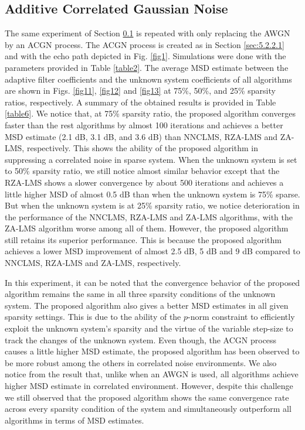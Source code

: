 \vspace{-0.3cm}
\subsection{Additive Correlated Gaussian Noise}\label{sec:5.3.2}
\vspace{-0.5cm}
\noindent The same experiment of Section \ref{sec:5.3.2} is repeated with only replacing the AWGN by an ACGN process. The ACGN process is created as in  Section \ref{sec:5.2.2.1} and with the echo path depicted in Fig. \ref{fig1}. Simulations were done with the parameters provided in Table \ref{table2}. The average MSD estimate between the adaptive filter coefficients and the unknown system coefficients of all algorithms are shown in Figs. \ref{fig11}, \ref{fig12} and \ref{fig13} at 75\%, 50\%, and 25\% sparsity ratios, respectively. A summary of the obtained results is provided in Table \ref{table6}. We notice that, at 75\% sparsity ratio, the proposed algorithm converges faster than the rest algorithms by almost 100 iterations and achieves a better MSD estimate (2.1 dB, 3.1 dB, and 3.6 dB) than NNCLMS, RZA-LMS and ZA-LMS, respectively. This shows the ability of the proposed algorithm in suppressing a correlated noise in sparse system. When the unknown system is set to 50\% sparsity ratio, we still notice almost similar behavior except that the RZA-LMS shows a slower convergence by about 500 iterations and achieves a little higher MSD of almost 0.5 dB than when the unknown system is 75\% sparse. But when the unknown system is at 25\% sparsity ratio, we notice deterioration in the performance of the NNCLMS, RZA-LMS and ZA-LMS algorithms, with the ZA-LMS algorithm worse among all of them. However, the proposed algorithm still retains its superior performance. This is because the proposed algorithm achieves a lower MSD improvement of almost 2.5 dB, 5 dB and 9 dB compared to NNCLMS, RZA-LMS and ZA-LMS, respectively.

\vspace{-0.5cm}
\par
\noindent In this experiment, it can be noted that the convergence behavior of the proposed algorithm remains the same in all three sparsity conditions of the unknown system. The proposed algorithm also gives a better MSD estimates in all given sparsity settings. This is due to the ability of the $p$-norm constraint to efficiently exploit the unknown system's sparsity and the virtue of the variable step-size to track the changes of the unknown system. Even though, the ACGN process causes a little higher MSD estimate, the proposed algorithm has been observed to be more robust among the others in correlated noise environments.
We also notice from the result that, unlike when an AWGN is used, all algorithms achieve higher MSD estimate in correlated environment. However, despite this challenge we still observed that the proposed algorithm shows the same convergence rate across every sparsity condition of the system and simultaneously outperform all algorithms in terms of MSD estimates.

